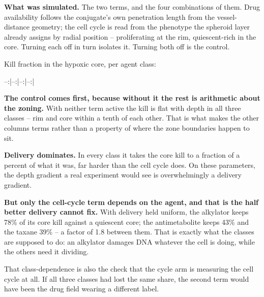 \documentclass[11pt,twoside,openright]{report}
\begin{document}
\textbf{What was simulated.} The two terms, and the four combinations of them. Drug availability follows the conjugate's own penetration length from the vessel-distance geometry; the cell cycle is read from the phenotype the spheroid layer already assigns by radial position -- proliferating at the rim, quiescent-rich in the core. Turning each off in turn isolates it. Turning both off is the control.

\begin{numbers}
Kill fraction in the hypoxic core, per agent class:


--:|--:|--:|--:|



\end{numbers}

\textbf{The control comes first, because without it the rest is arithmetic about the zoning.} With neither term active the kill is flat with depth in all three classes -- rim and core within a tenth of each other. That is what makes the other columns terms rather than a property of where the zone boundaries happen to sit.

\begin{finding}
\textbf{Delivery dominates.} In every class it takes the core kill to a fraction of a percent of what it was, far harder than the cell cycle does. On these parameters, the depth gradient a real experiment would see is overwhelmingly a delivery gradient.

\textbf{But only the cell-cycle term depends on the agent, and that is the half better delivery cannot fix.} With delivery held uniform, the alkylator keeps 78\% of its core kill against a quiescent core; the antimetabolite keeps 43\% and the taxane 39\% -- a factor of 1.8 between them. That is exactly what the classes are supposed to do: an alkylator damages DNA whatever the cell is doing, while the others need it dividing.

That class-dependence is also the check that the cycle arm is measuring the cell cycle at all. If all three classes had lost the same share, the second term would have been the drug field wearing a different label.
\end{finding}
\end{document}
